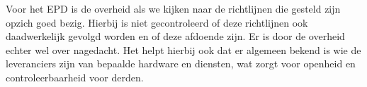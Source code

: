 Voor het EPD is de overheid als we kijken naar de richtlijnen die gesteld zijn opzich goed bezig. Hierbij is niet gecontroleerd of deze richtlijnen ook daadwerkelijk gevolgd worden en of deze afdoende zijn. Er is door de overheid echter wel over nagedacht. Het helpt hierbij ook dat er algemeen bekend is wie de leveranciers zijn van bepaalde hardware en diensten, wat zorgt voor openheid en controleerbaarheid voor derden.
